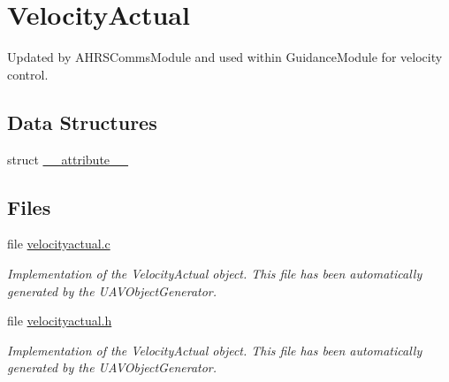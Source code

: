 \hypertarget{group___velocity_actual}{\section{\-Velocity\-Actual}
\label{group___velocity_actual}
}


\-Updated by \-A\-H\-R\-S\-Comms\-Module and used within \-Guidance\-Module for velocity control.  


\subsection*{\-Data \-Structures}
\begin{DoxyCompactItemize}
\item 
struct \hyperlink{struct____attribute____}{\-\_\-\-\_\-attribute\-\_\-\-\_\-}
\end{DoxyCompactItemize}
\subsection*{\-Files}
\begin{DoxyCompactItemize}
\item 
file \hyperlink{velocityactual_8c}{velocityactual.\-c}
\begin{DoxyCompactList}\small\item\em \-Implementation of the \-Velocity\-Actual object. \-This file has been automatically generated by the \-U\-A\-V\-Object\-Generator. \end{DoxyCompactList}\item 
file \hyperlink{velocityactual_8h}{velocityactual.\-h}
\begin{DoxyCompactList}\small\item\em \-Implementation of the \-Velocity\-Actual object. \-This file has been automatically generated by the \-U\-A\-V\-Object\-Generator. \end{DoxyCompactList}\end{DoxyCompactItemize}
